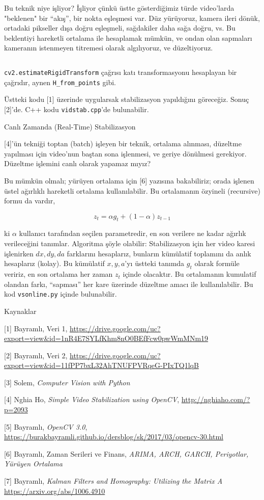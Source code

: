 \documentclass[12pt,fleqn]{article}\usepackage{../../common}
\begin{document}
Bu teknik niye işliyor? İşliyor çünkü üstte gösterdiğimiz türde video'larda
"beklenen" bir ``akış'', bir nokta eşleşmesi var. Düz yürüyoruz, kamera
ileri dönük, ortadaki pikseller dışa doğru eşleşmeli, sağdakiler daha sağa
doğru, vs.  Bu beklentiyi hareketli ortalama ile hesaplamak mümkün, ve
ondan olan sapmaları kameranın istenmeyen titremesi olarak algılıyoruz, ve
düzeltiyoruz.

\inputminted[fontsize=\footnotesize]{python}{vidstab.py}

\verb!cv2.estimateRigidTransform! çağrısı katı transformasyonu hesaplayan
bir çağrıdır, aynen \verb!H_from_points! gibi. 

Üstteki kodu [1] üzerinde uygularsak stabilizasyon yapıldığını
göreceğiz. Sonuç [2]'de. C++ kodu \verb!vidstab.cpp!'de bulunabilir.

Canlı Zamanda (Real-Time) Stabilizasyon

[4]'ün tekniği toptan (batch) işleyen bir teknik, ortalama alınması,
düzeltme yapılması için video'nun baştan sona işlenmesi, ve geriye
dönülmesi gerekiyor. Düzeltme işlemini canlı olarak yapamaz mıyız?

Bu mümkün olmalı; yürüyen ortalama için [6] yazısına bakabiliriz;
orada işlenen üstel ağırlıklı hareketli ortalama kullanılabilir. Bu
ortalamanın özyineli (recursive) formu da vardır,

$$ z_t = \alpha g_t + (1-\alpha) z_{t-1}$$

ki $\alpha$ kullanıcı tarafından seçilen parametredir, en son verilere ne
kadar ağırlık verileceğini tanımlar. Algoritma şöyle olabilir:
Stabilizasyon için her video karesi işlenirken $dx,dy,da$ farklarını
hesaplarız, bunların kümülatif toplamını da anlık hesaplarız (kolay). Bu
kümülatif $x,y,a$'yı üstteki tanımda $g_t$ olarak formüle veririz, en son
ortalama her zaman $z_t$ içinde olacaktır. Bu ortalamanın kumulatif olandan
farkı, ``sapması'' her kare üzerinde düzeltme amacı ile kullanılabilir. Bu
kod \verb!vsonline.py! içinde bulunabilir.

Kaynaklar

[1] Bayramlı, Veri 1, \url{https://drive.google.com/uc?export=view&id=1nR4E7SYLfKhm8nO0BEfFcw0pwWmMNm19}

[2] Bayramlı, Veri 2, \url{https://drive.google.com/uc?export=view&id=11fPP7bxL32AhTNUFPVRqeG-PIxTQ1lqB}

[3] Solem, {\em Computer Vision with Python}

[4] Nghia Ho, {\em Simple Video Stabilization using OpenCV},
    \url{http://nghiaho.com/?p=2093}

[5] Bayramlı, {\em OpenCV 3.0}, 
    \url{https://burakbayramli.github.io/dersblog/sk/2017/03/opencv-30.html}

[6] Bayramlı, Zaman Serileri ve Finans, {\em ARIMA, ARCH, GARCH, Periyotlar, Yürüyen Ortalama}

[7] Bayramlı, {\em Kalman Filters and Homography: Utilizing the Matrix A}
    \url{https://arxiv.org/abs/1006.4910}


    
\end{document}
